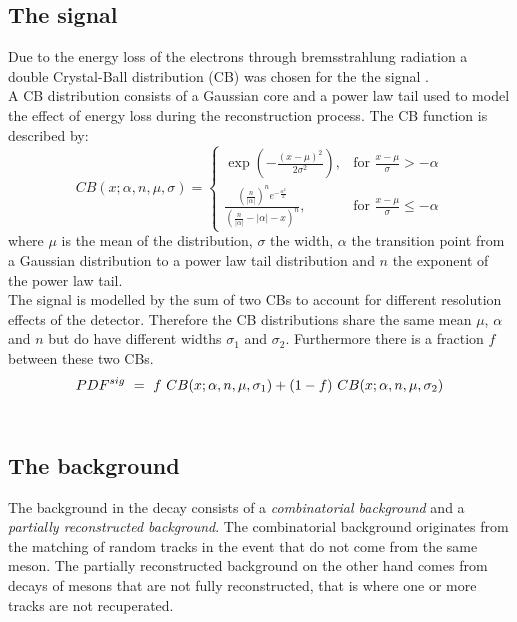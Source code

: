 \subsection{The signal \PDF}
Due to the energy loss of the electrons through bremsstrahlung radiation a double Crystal-Ball distribution (CB)\cite{crystal} was chosen for the the signal \PDF. \\
A CB distribution consists of a Gaussian core and a power law tail used to model the effect of energy loss during the reconstruction process. The CB function is described by:\\
\begin{equation}
CB(x;\alpha,n,\mu,\sigma) =  \begin{cases} \exp(- \frac{(x - \mu)^2}{2 \sigma^2}), & \mbox{for }\frac{x - \mu}{\sigma} > -\alpha \\ \frac{\left(\frac{n}{|\alpha|}\right)^n e^{-\frac{\alpha^2}{2}} }{\left(\frac{n}{|\alpha|} - |\alpha| -x\right)^n}, & \mbox{for }\frac{x - \mu}{\sigma} \leqslant -\alpha \end{cases} 
\end{equation}
where $\mu$ is the mean of the distribution, $\sigma$ the width, $\alpha$ the transition point from a Gaussian distribution to a power law tail distribution and $n$ the exponent of the power law tail.\\
The signal \PDF is modelled by the sum of two CBs to account for different resolution effects of the \lhcb detector. Therefore the CB distributions share the same mean $\mu$, $\alpha$ and $n$ but do have different widths $\sigma_1$ and $\sigma_2$. Furthermore there is a fraction $f$ between these two CBs.
\begin{equation}
\PDF^{sig} \ = \ f\ CB(x;\alpha,n,\mu,\sigma_1) + (1-f)\ CB(x;\alpha,n,\mu,\sigma_2)
\label{eq:dcb}
\end{equation}
\\
\subsection{The background \PDF}
The background in the \BdKstee decay consists of a \textit{combinatorial background} and a \textit{partially reconstructed background}. The combinatorial background originates from the matching of random tracks in the event that do not come from the same \B meson. The partially reconstructed background on the other hand comes from decays of \B mesons that are not fully reconstructed, that is where one or more tracks are not recuperated.\\

